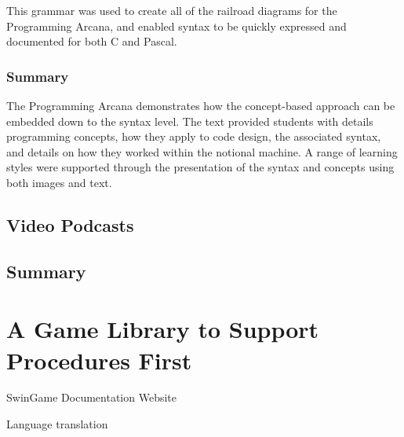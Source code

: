 This grammar was used to create all of the railroad diagrams for the Programming Arcana, and enabled syntax to be quickly expressed and documented for both C and Pascal.


\subsubsection{Summary} %
\label{ssub:arcana_summary}

The Programming Arcana demonstrates how the concept-based approach can be embedded down to the syntax level. The text provided students with details programming concepts, how they apply to code design, the associated syntax, and details on how they worked within the notional machine. A range of learning styles were supported through the presentation of the syntax and concepts using both images and text. 




\subsection{Video Podcasts} %
\label{sub:vodcasts}


\subsection{Summary} %
\label{sub:arcana_summary}



\section{A Game Library to Support Procedures First} %
\label{sec:swingame}

SwinGame Documentation Website

Language translation







